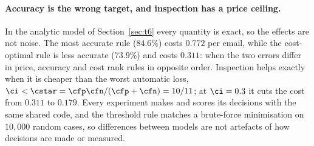 \paragraph{Accuracy is the wrong target, and inspection has a price ceiling.}
In the analytic model of Section~\ref{sec:t6} every quantity is exact, so the effects are not noise. The most
accurate rule ($84.6\%$) costs $0.772$ per email, while the cost-optimal rule is less accurate ($73.9\%$) and
costs $0.311$: when the two errors differ in price, accuracy and cost rank rules in opposite order. Inspection
helps exactly when it is cheaper than the worst automatic loss, $\ci<\cstar=\cfp\cfn/(\cfp+\cfn)=10/11$; at
$\ci=0.3$ it cuts the cost from $0.311$ to $0.179$. Every experiment makes and scores its decisions with the
same shared code, and the threshold rule matches a brute-force minimisation on $10{,}000$ random cases, so
differences between models are not artefacts of how decisions are made or measured.
